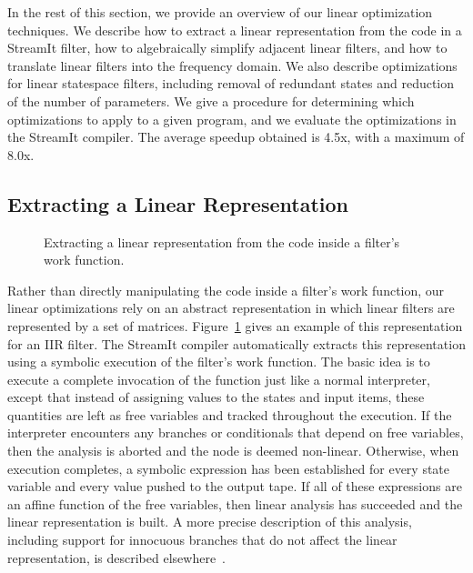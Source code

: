 In the rest of this section, we provide an overview of our linear
optimization techniques.  We describe how to extract a linear
representation from the code in a StreamIt filter, how to
algebraically simplify adjacent linear filters, and how to translate
linear filters into the frequency domain.  We also describe
optimizations for linear statespace filters, including removal of
redundant states and reduction of the number of parameters.  We give a
procedure for determining which optimizations to apply to a given
program, and we evaluate the optimizations in the StreamIt compiler.
The average speedup obtained is 4.5x, with a maximum of 8.0x.

\subsection*{Extracting a Linear Representation}

\begin{figure}[t]
\caption[Extracting a linear representation]{Extracting a linear
  representation from the code inside a filter's work
  function.\protect\label{fig:extraction}}
\end{figure}

Rather than directly manipulating the code inside a filter's work
function, our linear optimizations rely on an abstract representation
in which linear filters are represented by a set of matrices.
Figure~\ref{fig:extraction} gives an example of this representation
for an IIR filter.  The StreamIt compiler automatically extracts this
representation using a symbolic execution of the filter's work
function.  The basic idea is to execute a complete invocation of the
function just like a normal interpreter, except that instead of
assigning values to the states and input items, these quantities are
left as free variables and tracked throughout the execution.  If the
interpreter encounters any branches or conditionals that depend on
free variables, then the analysis is aborted and the node is deemed
non-linear.  Otherwise, when execution completes, a symbolic
expression has been established for every state variable and every
value pushed to the output tape.  If all of these expressions are an
affine function of the free variables, then linear analysis has
succeeded and the linear representation is built.  A more precise
description of this analysis, including support for innocuous branches
that do not affect the linear representation, is described
elsewhere~\cite{lamb-pldi03}.

